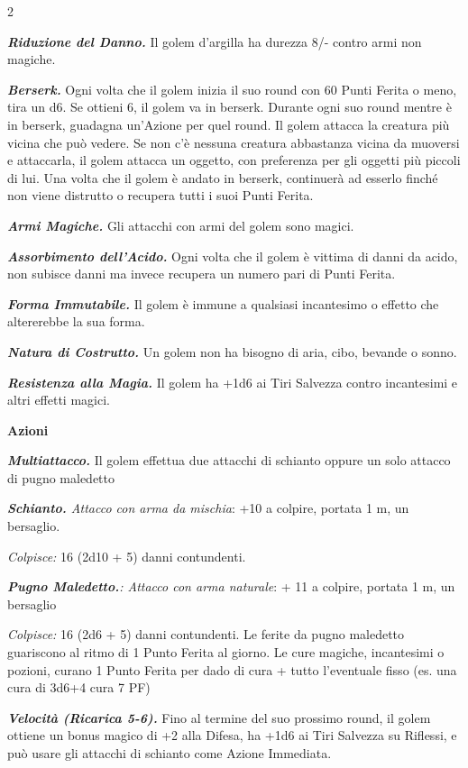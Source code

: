 \begin{multicols}{2}
{\emph{\textbf{Riduzione del Danno.}} Il golem d'argilla ha durezza 8/- contro armi non magiche.

\emph{\textbf{Berserk.}} Ogni volta che il golem inizia il suo round con 60 Punti Ferita o meno, tira un d6. Se ottieni 6, il golem va in berserk. Durante ogni suo round mentre è in berserk, guadagna un'Azione per quel round. Il golem attacca la creatura più vicina che può vedere. Se non c'è nessuna creatura abbastanza vicina da muoversi e attaccarla, il golem attacca un oggetto, con preferenza per gli oggetti più piccoli di lui. Una volta che il golem è andato in berserk, continuerà ad esserlo finché non viene distrutto o recupera tutti i suoi Punti Ferita.

\emph{\textbf{Armi Magiche.}} Gli attacchi con armi del golem sono magici.

\emph{\textbf{Assorbimento dell'Acido.}} Ogni volta che il golem è vittima di danni da acido, non subisce danni ma invece recupera un numero pari di Punti Ferita.

\emph{\textbf{Forma Immutabile.}} Il golem è immune a qualsiasi incantesimo o effetto che altererebbe la sua forma.

\emph{\textbf{Natura di Costrutto.}} Un golem non ha bisogno di aria, cibo, bevande o sonno.

\emph{\textbf{Resistenza alla Magia.}} Il golem ha +1d6 ai Tiri Salvezza contro incantesimi e altri effetti magici.

\textbf{Azioni}

\emph{\textbf{Multiattacco.}} Il golem effettua due attacchi di schianto oppure un solo attacco di pugno maledetto

\emph{\textbf{Schianto.} Attacco con arma da mischia}: +10 a colpire, portata 1 m, un bersaglio.

\emph{Colpisce:} 16 (2d10 + 5) danni contundenti.

\emph{\textbf{Pugno Maledetto.}: Attacco con arma naturale}: + 11 a colpire, portata 1 m, un bersaglio

\emph{Colpisce:} 16 (2d6 + 5) danni contundenti. Le ferite da pugno maledetto guariscono al ritmo di 1 Punto Ferita al giorno. Le cure magiche, incantesimi o pozioni, curano 1 Punto Ferita per dado di cura + tutto l'eventuale fisso (es. una cura di 3d6+4 cura 7 PF)

\emph{\textbf{Velocità (Ricarica 5-6).}} Fino al termine del suo prossimo round, il golem ottiene un bonus magico di +2 alla Difesa, ha +1d6 ai Tiri Salvezza su Riflessi, e può usare gli attacchi di schianto come Azione Immediata.

}
\end{multicols}
